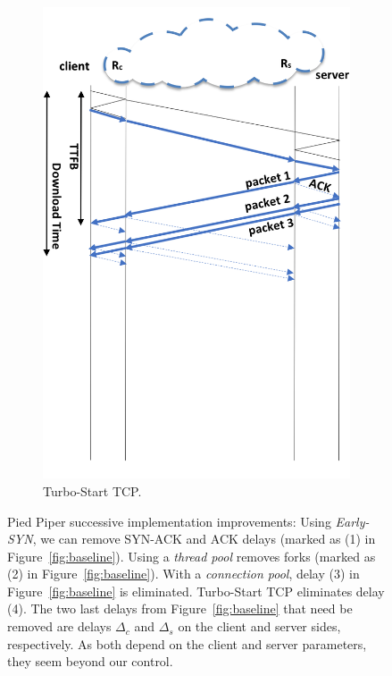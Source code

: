 \documentclass[newfonts=false,format=sigconf,10pt,letterpaper]{acmart}
\newcommand{\oursys}{Pied Piper\xspace}
\begin{document}
\begin{figure}[!t]
\begin{subfigure}{0.48\columnwidth}
  \includegraphics[width=\columnwidth]{figures/turbo.png}
    \caption{Turbo-Start TCP.} \label{fig:turbo-start-tcp}
\end{subfigure}
    \caption{\oursys successive implementation improvements: Using \textit{Early-SYN}, we can remove SYN-ACK and ACK delays (marked as (1) in Figure~\ref{fig:baseline}). Using a \textit{thread pool} removes forks (marked as (2) in Figure~\ref{fig:baseline}). With a \textit{connection pool}, delay (3) in Figure~\ref{fig:baseline} is eliminated. Turbo-Start TCP eliminates delay (4). The two last delays from Figure~\ref{fig:baseline} that need be removed are delays $\Delta_c$ and $\Delta_s$ on the client and server sides, respectively. As both depend on the client and server parameters, they seem beyond our control. 
    }
    \label{fig:KSPLIT-improvements}
\end{figure}
\end{document}
